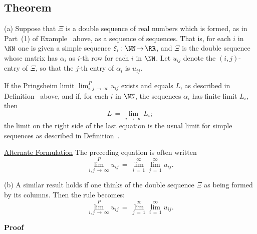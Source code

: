{\V
\V

            \subsection{\small{\bf Theorem}}
            \label{ThmC100.130}

\V

\hspace*{\parindent}
        (a) Suppose that ${\Xi}$ is a double sequence of real numbers which is formed, as in Part~(1) of Example~ above,
    as a sequence of sequences.
    That is, for each $i$ in ${\NN}$ one is given a simple sequence ${\xi}_{i}:{\NN} \,{\rightarrow}\, {\RR}$,
    and ${\Xi}$ is the double sequence whose matrix has ${\alpha}_{i}$ as $i$-th row for each $i$ in ${\NN}$. Let $u_{ij}$ denote the $(i,j)$-entry of ${\Xi}$, so that the $j$-th entry of ${\alpha}_{i}$ is $u_{ij}$.

        If the Pringsheim limit $\lim_{i,j \,{\rightarrow}\, {\infty}}^{P} u_{ij}$ exists and equals $L$, as described in Definition~ above,
    and if, for each $i$ in ${\NN}$, the sequences ${\alpha}_{i}$ has finite limit $L_{i}$, then
        \begin{displaymath}
        L \,=\, \lim_{i \,{\rightarrow}\, {\infty}} L_{i};
        \end{displaymath}
    the limit on the right side of the last equation is the usual limit for simple sequences as described in Definition~.

        \underline{Alternate Formulation} The preceding equation is often written
        \begin{equation}
        \label{EqnC.160A}
        \lim_{i,j \,{\rightarrow}\, {\infty}}^{P} u_{ij} \,=\, \lim_{i \,=\, 1}^{{\infty}} \lim_{j \,=\, 1}^{{\infty}} u_{ij}.
        \end{equation}

\V

        (b) A similar result holds if one thinks of the double sequence ${\Xi}$ as being formed by its columns.
    Then the rule becomes:
        \begin{equation}
        \label{EqnC.160B}
        \lim_{i,j \,{\rightarrow}\, {\infty}}^{P} u_{ij} \,=\, \lim_{j \,=\, 1}^{{\infty}} \lim_{i \,=\, 1}^{{\infty}} u_{ij}.
        \end{equation}


\V

        {\bf Proof}

}
